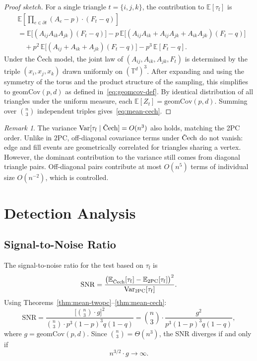 \documentclass[reqno,12pt]{amsart}
\newcommand{\tauf}{\tau_{\mathrm{f}}}
\newcommand{\PC}{\mathrm{2PC}}
\newcommand{\Cech}{\ifmmode\text{\v{C}ech}\else\v{C}ech\fi}  %
\newcommand{\geomCov}{\mathrm{geomCov}}
\newcommand{\TT}{\mathbb{T}}         %
\newcommand{\EE}{\mathbb{E}}
\DeclareMathOperator{\Var}{Var}
\theoremstyle{plain}
\theoremstyle{definition}
\theoremstyle{remark}
\newtheorem{remark}[theorem]{Remark}
\begin{document}
\begin{proof}[Proof sketch]
For a single triangle $t = \{i,j,k\}$, the contribution to $\EE[\tauf]$ is
\begin{align*}
  &\EE\!\left[\prod_{e\in\partial t}(A_e-p)\cdot(F_t-q)\right]\\
  &= \EE\!\bigl[(A_{ij}A_{ik}A_{jk})(F_t - q)\bigr]
    - p\,\EE\!\bigl[(A_{ij}A_{ik}+A_{ij}A_{jk}+A_{ik}A_{jk})(F_t-q)\bigr]\\
  &\quad + p^2\,\EE\!\bigl[(A_{ij}+A_{ik}+A_{jk})(F_t-q)\bigr]
    - p^3\,\EE[F_t-q].
\end{align*}
Under the \v{C}ech model, the joint law of $(A_{ij}, A_{ik}, A_{jk}, F_t)$ is determined by
the triple $(x_i,x_j,x_k)$ drawn uniformly on $(\TT^d)^3$. After expanding and using the
symmetry of the torus and the product structure of the sampling, this simplifies to
$\geomCov(p,d)$ as defined in~\eqref{eq:geomcov-def}. By identical distribution of all
triangles under the uniform measure, each $\EE[Z_t] = \geomCov(p,d)$. Summing over
$\binom{n}{3}$ independent triples gives~\eqref{eq:mean-cech}.
\end{proof}

\begin{remark}\label{rem:var-cech}
The variance $\Var[\tauf\mid\Cech] = O(n^3)$ also holds, matching the 2PC order. Unlike in
$\PC$, off-diagonal covariance terms under $\Cech$ do not vanish: edge and fill events are
geometrically correlated for triangles sharing a vertex. However, the dominant contribution
to the variance still comes from diagonal triangle pairs. Off-diagonal pairs contribute at
most $O(n^5)$ terms of individual size $O(n^{-2})$, which is controlled.
\end{remark}

\section{Detection Analysis}\label{sec:detection}

\subsection{Signal-to-Noise Ratio}

The signal-to-noise ratio for the test based on $\tauf$ is
\[
  \mathrm{SNR} = \frac{\bigl(\EE_{\Cech}[\tauf] - \EE_{\PC}[\tauf]\bigr)^2}{\Var_{\PC}[\tauf]}.
\]
Using Theorems~\ref{thm:mean-twopc}--\ref{thm:mean-cech}:
\begin{equation}\label{eq:snr}
  \mathrm{SNR} = \frac{\bigl[\binom{n}{3}\cdot g\bigr]^2}{\binom{n}{3}\cdot p^3(1-p)^3 q(1-q)}
  = \binom{n}{3}\cdot \frac{g^2}{p^3(1-p)^3 q(1-q)},
\end{equation}
where $g = \geomCov(p,d)$. Since $\binom{n}{3} = \Theta(n^3)$, the SNR diverges if and only if
\begin{equation}\label{eq:detection-cond}
  n^{3/2}\cdot g \to\infty.
\end{equation}
\end{document}
